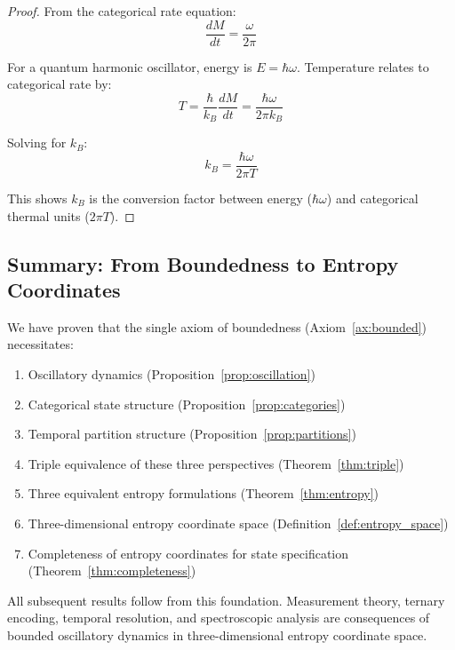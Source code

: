 \begin{proof}
From the categorical rate equation:
\begin{equation}
\frac{dM}{dt} = \frac{\omega}{2\pi}
\end{equation}

For a quantum harmonic oscillator, energy is $E = \hbar\omega$. Temperature relates to categorical rate by:
\begin{equation}
T = \frac{\hbar}{k_B} \frac{dM}{dt} = \frac{\hbar \omega}{2\pi k_B}
\end{equation}

Solving for $k_B$:
\begin{equation}
k_B = \frac{\hbar \omega}{2\pi T}
\end{equation}

This shows $k_B$ is the conversion factor between energy ($\hbar\omega$) and categorical thermal units ($2\pi T$).
\end{proof}

\subsection{Summary: From Boundedness to Entropy Coordinates}

We have proven that the single axiom of boundedness (Axiom~\ref{ax:bounded}) necessitates:
\begin{enumerate}
\item Oscillatory dynamics (Proposition~\ref{prop:oscillation})
\item Categorical state structure (Proposition~\ref{prop:categories})
\item Temporal partition structure (Proposition~\ref{prop:partitions})
\item Triple equivalence of these three perspectives (Theorem~\ref{thm:triple})
\item Three equivalent entropy formulations (Theorem~\ref{thm:entropy})
\item Three-dimensional entropy coordinate space (Definition~\ref{def:entropy_space})
\item Completeness of entropy coordinates for state specification (Theorem~\ref{thm:completeness})
\end{enumerate}

All subsequent results follow from this foundation. Measurement theory, ternary encoding, temporal resolution, and spectroscopic analysis are consequences of bounded oscillatory dynamics in three-dimensional entropy coordinate space.
